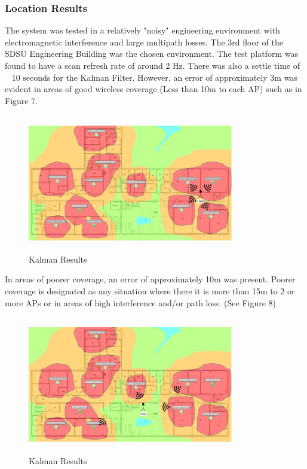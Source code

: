 \documentclass[conference]{IEEEtran}
\begin{document}
\subsubsection{Location Results}
The system was tested in a relatively "noisy" engineering environment with electromagnetic interference and large multipath losses. The 3rd floor of the SDSU Engineering Building was the chosen environment. The test platform was found to have a scan refresh rate of around 2 Hz. There was also a settle time of ~ 10 seconds for the Kalman Filter. However, an error of approximately 3m was evident in areas of good wireless coverage (Less than 10m to each AP) such as in Figure 7.
\begin{figure}[H]
    \includegraphics[width=9.0cm,height=6cm]{Geolocation_1.jpeg}
    \caption{Kalman Results}
    \end{figure}


In areas of poorer coverage, an error of approximately 10m was present. Poorer coverage is designated as any situation where there it is more than 15m to 2 or more APs or in areas of high interference and/or path loss. (See Figure 8)
\begin{figure}[H]
    \includegraphics[width=9.0cm,height=6cm]{Geolocation_2.jpeg}
    \caption{Kalman Results}
    \end{figure}
\end{document}

